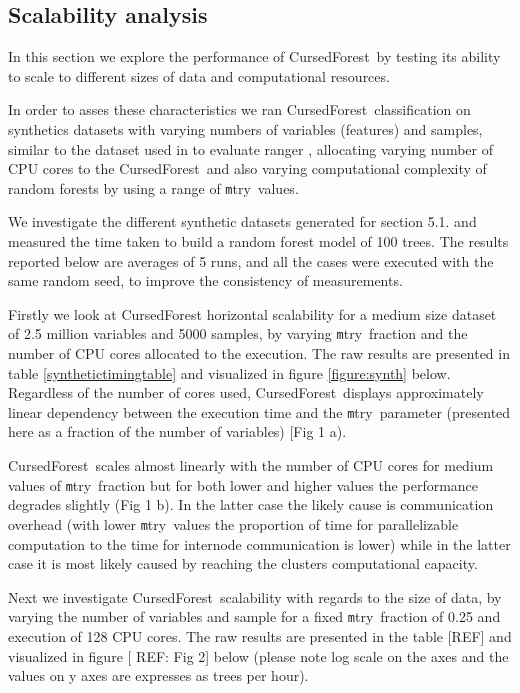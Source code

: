 \documentclass[10pt,letterpaper]{article}
\newcommand{\cursedforest}{{\sc CursedForest}}
\newcommand{\mtry}{{\texttt mtry}}
\begin{document}
\subsection{Scalability analysis}

In this section we explore the performance of \cursedforest\ by testing its ability to scale to different sizes of data
and computational resources.

In order to asses these characteristics we ran \cursedforest\ classification on synthetics datasets with varying numbers
of variables (features) and samples, similar to the dataset used in to evaluate ranger \cite{Wright.and.Ziegle.2016},
allocating varying number of CPU cores to the \cursedforest\ and also varying computational complexity of random forests
by using a range of \mtry\ values.


We investigate the different synthetic datasets generated for section 5.1. and measured the time taken to build a random
forest model of 100 trees. The results reported below are averages of 5 runs, and all the cases were executed with the
same random seed, to improve the consistency of measurements.

Firstly we look at CursedForest horizontal scalability for a medium size dataset of 2.5 million variables and 5000
samples, by varying \mtry\ fraction and the number of CPU cores allocated to the execution. The raw results are
presented in table \ref{synthetictimingtable} and visualized in figure \ref{figure:synth} below. Regardless of the number of cores used,
\cursedforest\ displays approximately linear dependency between the execution time and the \mtry\ parameter (presented
here as a fraction of the number of variables) [Fig 1 a).

\cursedforest{}ales almost linearly with the number of CPU cores for medium values of \mtry\ fraction but for both
lower and higher values the performance degrades slightly (Fig 1 b). In the latter case the likely cause is
communication overhead (with lower \mtry\ values the proportion of time for parallelizable computation to the time for
internode communication is lower) while in the latter case it is most likely caused by reaching the clusters computational
capacity.

Next we investigate \cursedforest{}alability with regards to the size of data, by varying the number of variables and
sample for a fixed \mtry\ fraction of 0.25 and execution of 128 CPU cores. The raw results are presented in the table
[REF] and visualized in figure [ REF: Fig 2] below (please note log scale on the axes and the values on y axes are
expresses as trees per hour).
\end{document}
